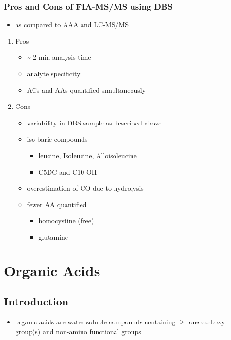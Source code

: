 \documentclass[12pt]{scrartcl}
\begin{document}
\subsubsection{Pros and Cons of FIA-MS/MS using DBS}
\label{sec:org13fd992}
\begin{itemize}
\item as compared to AAA and LC-MS/MS
\end{itemize}
\begin{enumerate}
\item Pros
\label{sec:orgf5d04af}
\begin{itemize}
\item \textasciitilde{} 2 min analysis time
\item analyte specificity
\item ACs and AAs quantified simultaneously
\end{itemize}

\item Cons
\label{sec:orgd92da11}
\begin{itemize}
\item variability in DBS sample as described above
\item iso-baric compounds
\begin{itemize}
\item leucine, Isoleucine, Alloisoleucine
\item C5DC and C10-OH
\end{itemize}
\item overestimation of CO due to hydrolysis
\item fewer AA quantified
\begin{itemize}
\item homocystine (free)
\item glutamine
\end{itemize}
\end{itemize}
\end{enumerate}
\section{Organic Acids}
\label{sec:org98c6fa3}
\subsection{Introduction}
\label{sec:org3703c33}
\begin{itemize}
\item organic acids are water soluble compounds containing \(\ge\) one
carboxyl group(s) and non-amino functional groups
\end{itemize}
\end{document}

